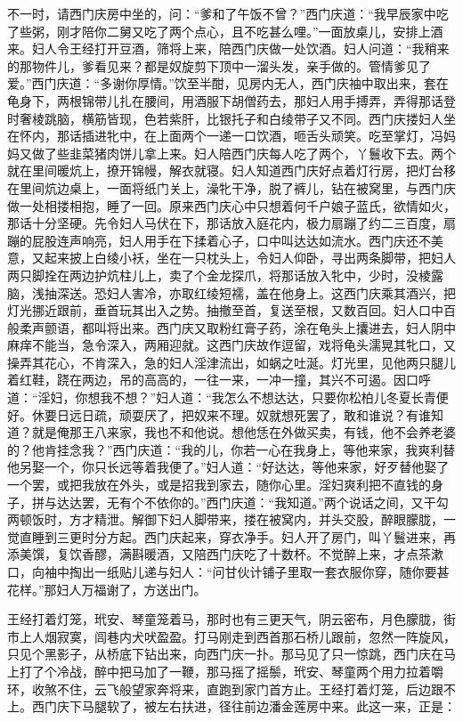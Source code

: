 不一时，请西门庆房中坐的，问：“爹和了午饭不曾？”西门庆道：“我早辰家中吃了些粥，刚才陪你二舅又吃了两个点心，且不吃甚么哩。”一面放桌儿，安排上酒来。妇人令王经打开豆酒，筛将上来，陪西门庆做一处饮酒。妇人问道：“我稍来的那物件儿，爹看见来？都是奴旋剪下顶中一溜头发，亲手做的。管情爹见了爱。”西门庆道：“多谢你厚情。”饮至半酣，见房内无人，西门庆袖中取出来，套在龟身下，两根锦带儿扎在腰间，用酒服下胡僧药去，那妇人用手搏弄，弄得那话登时奢棱跳脑，横筋皆现，色若紫肝，比银托子和白绫带子又不同。西门庆搂妇人坐在怀内，那话插进牝中，在上面两个一递一口饮酒，咂舌头顽笑。吃至掌灯，冯妈妈又做了些韭菜猪肉饼儿拿上来。妇人陪西门庆每人吃了两个，丫鬟收下去。两个就在里间暖炕上，撩开锦幔，解衣就寝。妇人知道西门庆好点着灯行房，把灯台移在里间炕边桌上，一面将纸门关上，澡牝干净，脱了裤儿，钻在被窝里，与西门庆做一处相搂相抱，睡了一回。原来西门庆心中只想着何千户娘子蓝氏，欲情如火，那话十分坚硬。先令妇人马伏在下，那话放入庭花内，极力扇蹦了约二三百度，扇蹦的屁股连声响亮，妇人用手在下揉着心子，口中叫达达如流水。西门庆还不美意，又起来披上白绫小袄，坐在一只枕头上，令妇人仰卧，寻出两条脚带，把妇人两只脚拴在两边护炕柱儿上，卖了个金龙探爪，将那话放入牝中，少时，没棱露脑，浅抽深送。恐妇人害冷，亦取红绫短襦，盖在他身上。这西门庆乘其酒兴，把灯光挪近跟前，垂首玩其出入之势。抽撤至首，复送至根，又数百回。妇人口中百般柔声颤语，都叫将出来。西门庆又取粉红膏子药，涂在龟头上攮进去，妇人阴中麻痒不能当，急令深入，两厢迎就。这西门庆故作逗留，戏将龟头濡晃其牝口，又操弄其花心，不肯深入，急的妇人淫津流出，如蜗之吐涎。灯光里，见他两只腿儿着红鞋，跷在两边，吊的高高的，一往一来，一冲一撞，其兴不可遏。因口呼道：“淫妇，你想我不想？”妇人道：“我怎么不想达达，只要你松柏儿冬夏长青便好。休要日远日疏，顽耍厌了，把奴来不理。奴就想死罢了，敢和谁说？有谁知道？就是俺那王八来家，我也不和他说。想他恁在外做买卖，有钱，他不会养老婆的？他肯挂念我？”西门庆道：“我的儿，你若一心在我身上，等他来家，我爽利替他另娶一个，你只长远等着我便了。”妇人道：“好达达，等他来家，好歹替他娶了一个罢，或把我放在外头，或是招我到家去，随你心里。淫妇爽利把不直钱的身子，拼与达达罢，无有个不依你的。”西门庆道：“我知道。”两个说话之间，又干勾两顿饭时，方才精泄。解御下妇人脚带来，搂在被窝内，并头交股，醉眼朦胧，一觉直睡到三更时分方起。西门庆起来，穿衣净手。妇人开了房门，叫丫鬟进来，再添美馔，复饮香醪，满斟暖酒，又陪西门庆吃了十数杯。不觉醉上来，才点茶漱口，向袖中掏出一纸贴儿递与妇人：“问甘伙计铺子里取一套衣服你穿，随你要甚花样。”那妇人万福谢了，方送出门。

王经打着灯笼，玳安、琴童笼着马，那时也有三更天气，阴云密布，月色朦胧，街市上人烟寂寞，闾巷内犬吠盈盈。打马刚走到西首那石桥儿跟前，忽然一阵旋风，只见个黑影子，从桥底下钻出来，向西门庆一扑。那马见了只一惊跳，西门庆在马上打了个冷战，醉中把马加了一鞭，那马摇了摇鬃，玳安、琴童两个用力拉着嚼环，收煞不住，云飞般望家奔将来，直跑到家门首方止。王经打着灯笼，后边跟不上。西门庆下马腿软了，被左右扶进，径往前边潘金莲房中来。此这一来，正是：

